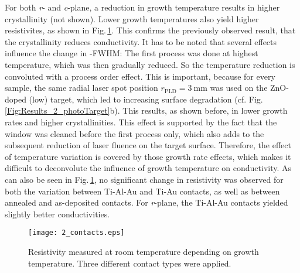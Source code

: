 For both \textit{r}- and \textit{c}-plane, a reduction in growth temperature results in higher crystallinity (not shown).
Lower growth temperatures also yield higher resistivites, as shown in Fig.\,\ref{Fig:Results_2_contacts}.
This confirms the previously observed result, that the crystallinity reduces conductivity.
It has to be noted that several effects influence the change in \textomega-FWHM:
The first process was done at highest temperature, which was then gradually reduced.
So the temperature reduction is convoluted with a process order effect.
This is important, because for every sample, the same radial laser spot position $r_\mathrm{PLD}=\qty{3}{\mm}$ was used on the ZnO-doped (low) target, which led to increasing surface degradation (cf. Fig.\,\ref{Fig:Results_2_photoTarget}b).
This results, as shown before, in lower growth rates and higher crystallinities.
This effect is supported by the fact that the window was cleaned before the first process only, which also adds to the subsequent reduction of laser fluence on the target surface.
Therefore, the effect of temperature variation is covered by those growth rate effects, which makes it difficult to deconvolute the influence of growth temperature on conductivity.
As can also be seen in Fig.\,\ref{Fig:Results_2_contacts}, no significant change in resistivity was observed for both the variation between Ti-Al-Au and Ti-Au contacts, as well as between annealed and as-deposited contacts.
For \textit{r}-plane, the Ti-Al-Au contacts yielded slightly better conductivities.
\begin{figure}
    \centering
    \texttt{[image: 2\_contacts.eps]}
    \caption{Resistivity measured at room temperature depending on growth temperature.
    Three different contact types were applied.}
    \label{Fig:Results_2_contacts}
\end{figure}

